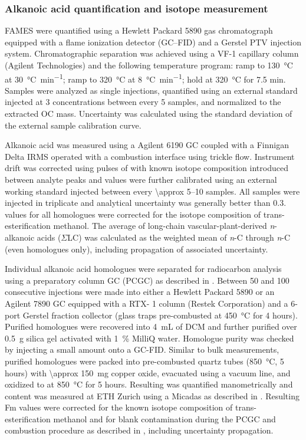 \subsubsection{Alkanoic acid quantification and isotope measurement}

FAMES were quantified using a Hewlett Packard 5890 gas chromatograph equipped with a flame ionization detector (GC--FID) and a Gerstel PTV injection system. Chromatographic separation was achieved using a VF-1 capillary column (Agilent Technologies) and the following temperature program: ramp to \SI{130}{\celsius} at \SI{30}{\celsius.min^{-1}}; ramp to \SI{320}{\celsius} at \SI{8}{\celsius.min^{-1}}; hold at \SI{320}{\celsius} for 7.5 min. Samples were analyzed as single injections, quantified using an external standard injected at 3 concentrations between every 5 samples, and normalized to the extracted OC mass. Uncertainty was calculated using the standard deviation of the external sample calibration curve.

Alkanoic acid  was measured using a Agilent 6190 GC coupled with a Finnigan Delta IRMS operated with a combustion interface using  trickle flow. Instrument drift was corrected using pulses of  with known isotope composition introduced between analyte peaks and  values were further calibrated using an external working standard injected between every \numrange{\approx 5}{10} samples. All samples were injected in triplicate and analytical uncertainty was generally better than \SI{0.3}{\permil}.  values for all homologues were corrected for the isotope composition of trans-esterification methanol. The average of long-chain vascular-plant-derived \textit{n}-alkanoic acids ($\Sigma$LC) was calculated as the weighted mean of \textit{n}-C through \textit{n}-C (even homologues only), including propagation of associated uncertainty.

Individual alkanoic acid homologues were separated for radiocarbon analysis using a preparatory column GC (PCGC) as described in \citet{Galy:2011hk}. Between 50 and 100 consecutive injections were made into either a Hewlett Packard 5890 or an Agilent 7890 GC equipped with a RTX- 1 column (Restek Corporation) and a 6-port Gerstel fraction collector (glass traps pre-combusted at \SI{450}{\celsius} for 4 hours). Purified homologues were recovered into \SI{4}{mL} of DCM and further purified over \SI{0.5}{g} silica gel activated with \SI{1}{\%} MilliQ water. Homologue purity was checked by injecting a small amount onto a GC-FID. Similar to bulk measurements, purified homologues were packed into pre-combusted quartz tubes (\SI{850}{\celsius}, 5 hours) with \SI{\approx 150}{mg} copper oxide, evacuated using a vacuum line, and oxidized to  at \SI{850}{\celsius} for 5 hours. Resulting  was quantified manometrically and  content was measured at ETH Zurich using a Micadas as described in \citet{Christl:2013ks}. Resulting Fm values were corrected for the known isotope composition of trans-esterification methanol and for blank contamination during the PCGC and combustion procedure as described in \citet{Fornace:2016th}, including uncertainty propagation.

